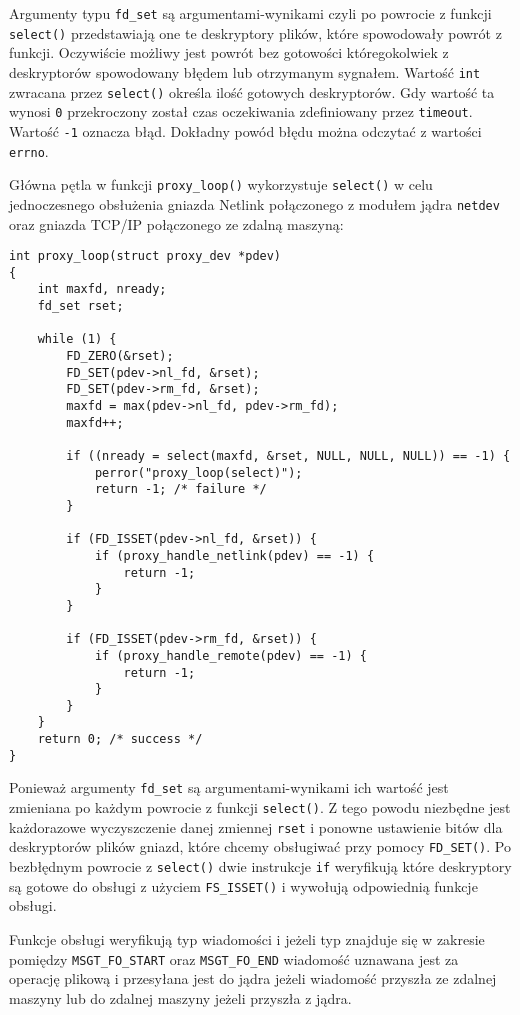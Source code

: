 \documentclass[10pt]{article}
\begin{document}
Argumenty typu \texttt{fd\_set} są argumentami-wynikami czyli po powrocie z funkcji \texttt{select()} przedstawiają one te deskryptory plików, które spowodowały powrót z funkcji. Oczywiście możliwy jest powrót bez gotowości któregokolwiek z deskryptorów spowodowany błędem lub otrzymanym sygnałem. Wartość \texttt{int} zwracana przez \texttt{select()} określa ilość gotowych deskryptorów. Gdy wartość ta wynosi \texttt{0} przekroczony został czas oczekiwania zdefiniowany przez \texttt{timeout}. Wartość \texttt{-1} oznacza błąd. Dokładny powód błędu można odczytać z wartości \texttt{errno}.

Główna pętla w funkcji \texttt{proxy\_loop()} wykorzystuje \texttt{select()} w celu jednoczesnego obsłużenia gniazda Netlink połączonego z modułem jądra \texttt{netdev} oraz gniazda TCP/IP połączonego ze zdalną maszyną:

\begin{verbatim}
int proxy_loop(struct proxy_dev *pdev)
{
    int maxfd, nready;
    fd_set rset;

    while (1) {
        FD_ZERO(&rset);
        FD_SET(pdev->nl_fd, &rset);
        FD_SET(pdev->rm_fd, &rset);
        maxfd = max(pdev->nl_fd, pdev->rm_fd);
        maxfd++;

        if ((nready = select(maxfd, &rset, NULL, NULL, NULL)) == -1) {
            perror("proxy_loop(select)");
            return -1; /* failure */
        }

        if (FD_ISSET(pdev->nl_fd, &rset)) {
            if (proxy_handle_netlink(pdev) == -1) {
                return -1;
            }
        }

        if (FD_ISSET(pdev->rm_fd, &rset)) {
            if (proxy_handle_remote(pdev) == -1) {
                return -1;
            }
        }
    }
    return 0; /* success */
}
\end{verbatim}

Ponieważ argumenty \texttt{fd\_set} są argumentami-wynikami ich wartość jest zmieniana po każdym powrocie z funkcji \texttt{select()}. Z tego powodu niezbędne jest każdorazowe wyczyszczenie danej zmiennej \texttt{rset} i ponowne ustawienie bitów dla deskryptorów plików gniazd, które chcemy obsługiwać przy pomocy \texttt{FD\_SET()}. Po bezbłędnym powrocie z \texttt{select()} dwie instrukcje \texttt{if} weryfikują które deskryptory są gotowe do obsługi z użyciem \texttt{FS\_ISSET()} i wywołują odpowiednią funkcje obsługi.

Funkcje obsługi weryfikują typ wiadomości i jeżeli typ znajduje się w zakresie pomiędzy \texttt{MSGT\_FO\_START} oraz \texttt{MSGT\_FO\_END} wiadomość uznawana jest za operację plikową i przesyłana jest do jądra jeżeli wiadomość przyszła ze zdalnej maszyny lub do zdalnej maszyny jeżeli przyszła z jądra.
\end{document}
